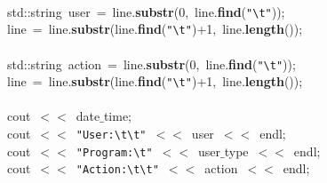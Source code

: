 \mbox{} \\
\mbox{}\ \ \ \ \ \ \ \ \ \ \ \ std::string\ user\ =\ line.\textbf{substr}(0,\ line.\textbf{find}(\texttt{"{}}\texttt{\textbackslash{}t}\texttt{"{}})); \\
\mbox{}\ \ \ \ \ \ \ \ \ \ \ \ line\ =\ line.\textbf{substr}(line.\textbf{find}(\texttt{"{}}\texttt{\textbackslash{}t}\texttt{"{}})+1,\ line.\textbf{length}()); \\
\mbox{} \\
\mbox{}\ \ \ \ \ \ \ \ \ \ \ \ std::string\ action\ =\ line.\textbf{substr}(0,\ line.\textbf{find}(\texttt{"{}}\texttt{\textbackslash{}t}\texttt{"{}})); \\
\mbox{}\ \ \ \ \ \ \ \ \ \ \ \ line\ =\ line.\textbf{substr}(line.\textbf{find}(\texttt{"{}}\texttt{\textbackslash{}t}\texttt{"{}})+1,\ line.\textbf{length}()); \\
\mbox{}\ \ \ \ \ \ \ \ \ \ \ \  \\
\mbox{}\ \ \ \ \ \ \ \ \ \ \ \ cout\ $<$$<$\ date$\_$time; \\
\mbox{}\ \ \ \ \ \ \ \ \ \ \ \ cout\ $<$$<$\ \texttt{"{}User:}\texttt{\textbackslash{}t\textbackslash{}t}\texttt{"{}}\ $<$$<$\ user\ $<$$<$\ endl; \\
\mbox{}\ \ \ \ \ \ \ \ \ \ \ \ cout\ $<$$<$\ \texttt{"{}Program:}\texttt{\textbackslash{}t}\texttt{"{}}\ $<$$<$\ user$\_$type\ $<$$<$\ endl; \\
\mbox{}\ \ \ \ \ \ \ \ \ \ \ \ cout\ $<$$<$\ \texttt{"{}Action:}\texttt{\textbackslash{}t\textbackslash{}t}\texttt{"{}}\ $<$$<$\ action\ $<$$<$\ endl; \\

